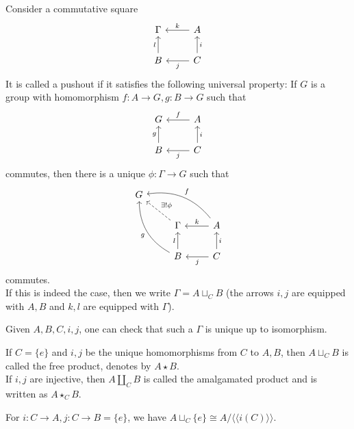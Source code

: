 \begin{definition}[Pushouts]
    Consider a commutative square
    \[
        \begin{tikzcd}
            \Gamma&A\arrow[swap]{l}{k}\\
            B\arrow{u}{l}&C\arrow{l}{j}\arrow[swap]{u}{i}
        \end{tikzcd}
    \]
    It is called a pushout if it satisfies the following universal property:
    If $G$ is a group with homomorphism $f:A\to G,g:B\to G$ such that
    \[
        \begin{tikzcd}
            G&A\arrow[swap]{l}{f}\\
            B\arrow{u}{g}&C\arrow{l}{j}\arrow[swap]{u}{i}
        \end{tikzcd}
    \]
    commutes, then there is a unique $\phi:\Gamma\to G$ such that
    \[
        \begin{tikzcd}
            G&&\\
            &\Gamma\arrow[swap,dashed]{ul}{\exists!\phi}&A\arrow[swap]{l}{k}\arrow[swap, bend right]{ull}{f}\\
            &B\arrow{u}{l}\arrow[bend left]{uul}{g}&C\arrow{l}{j}\arrow[swap]{u}{i}
        \end{tikzcd}
    \]
    commutes.\\
    If this is indeed the case, then we write $\Gamma=A\sqcup_CB$ (the arrows $i,j$ are equipped with $A,B$ and $k,l$ are equipped with $\Gamma$).
\end{definition}
Given $A,B,C,i,j$, one can check that such a $\Gamma$ is unique up to isomorphism.
\begin{definition}
    If $C=\{e\}$ and $i,j$ be the unique homomorphisms from $C$ to $A,B$, then $A\sqcup_CB$ is called the free product, denotes by $A\star B$.\\
    If $i,j$ are injective, then $A\coprod_CB$ is called the amalgamated product and is written as $A\star_CB$.
\end{definition}
\begin{lemma}\label{pushout_onetrivial}
    For $i:C\to A,j:C\to B=\{e\}$, we have $A\sqcup_C\{e\}\cong A/\langle\langle i(C)\rangle\rangle$.
\end{lemma}
